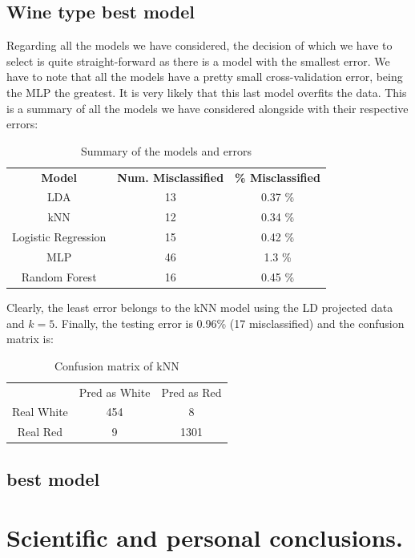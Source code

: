 \documentclass[10pt]{article}
\begin{document}
\subsection{Wine type best model}
Regarding all the models we have considered, the decision of which we have to select is quite straight-forward as there is a model with the smallest error. We have to note that all the models have a pretty small cross-validation error, being the MLP the greatest. It is very likely that this last model overfits the data. This is a summary of all the models we have considered alongside with their respective errors:

\begin{table}[H]
\centering
\caption{Summary of the models and errors}
\begin{tabular}{ccc}
\textbf{Model} & \textbf{Num. Misclassified} & \textbf{\% Misclassified} \\
LDA & 13 & 0.37 \% \\
kNN & 12 & 0.34 \% \\
Logistic Regression & 15 & 0.42 \% \\
MLP & 46 & 1.3 \% \\
Random Forest & 16 & 0.45 \%
\end{tabular}
\end{table}

Clearly, the least error belongs to the kNN model using the LD projected data and $k=5$. Finally, the testing error is 0.96\% (17 misclassified) and the confusion matrix is:

\begin{table}[H]
\centering
\caption{Confusion matrix of kNN}
\begin{tabular}{ccc}
 & Pred as White & Pred as Red \\
Real White & 454 & 8 \\
Real Red  & 9 & 1301
\end{tabular}
\end{table}



\subsection{ best model}

\section{Scientific and personal conclusions.}
\end{document}
